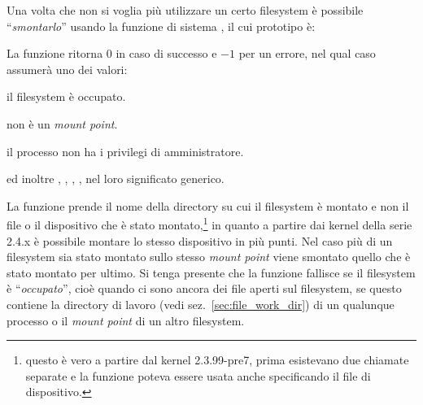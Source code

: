 



Una volta che non si voglia più utilizzare un certo filesystem è possibile
``\textsl{smontarlo}'' usando la funzione di sistema , il cui
prototipo è:

\begin{funcproto}{
}
{La funzione ritorna  $0$ in caso di successo e $-1$ per un errore,
  nel qual caso  assumerà uno dei valori: 
  \begin{errlist}
  \item[\errcode{EBUSY}] il filesystem è occupato.
  \item[\errcode{EINVAL}]  non è un \textit{mount point}.
  \item[\errcode{EPERM}] il processo non ha i privilegi di
    amministratore.\footnotemark 
  \end{errlist}
  ed inoltre , , ,
  ,  nel loro significato generico.  }
\end{funcproto}


La funzione prende il nome della directory su cui il filesystem è montato e
non il file o il dispositivo che è stato montato,\footnote{questo è vero a
  partire dal kernel 2.3.99-pre7, prima esistevano due chiamate separate e la
  funzione poteva essere usata anche specificando il file di dispositivo.} in
quanto a partire dai kernel della serie 2.4.x è possibile montare lo stesso
dispositivo in più punti. Nel caso più di un filesystem sia stato montato
sullo stesso \textit{mount point} viene smontato quello che è stato montato
per ultimo. Si tenga presente che la funzione fallisce se il filesystem è
``\textsl{occupato}'', cioè quando ci sono ancora dei file aperti sul
filesystem, se questo contiene la directory di lavoro (vedi
sez.~\ref{sec:file_work_dir}) di un qualunque processo o il \textit{mount
  point} di un altro filesystem.

